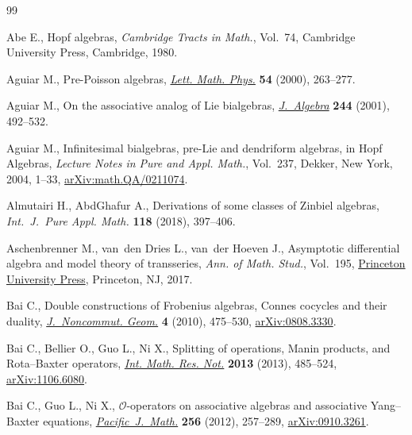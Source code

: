 \documentclass[10pt,a4paper]{amsart}
\numberwithin{equation}{section}
\begin{document}

\begin{thebibliography}{99}
\footnotesize\itemsep=0pt

Abe E., Hopf algebras, \textit{Cambridge Tracts in Math.}, Vol.~74, Cambridge
 University Press, Cambridge, 1980.

Aguiar M., Pre-{P}oisson algebras, \href{https://doi.org/10.1023/A:1010818119040}{\textit{Lett. Math. Phys.}} \textbf{54}
 (2000), 263--277.

Aguiar M., On the associative analog of {L}ie bialgebras, \href{https://doi.org/10.1006/jabr.2001.8877}{\textit{J.~Algebra}}
 \textbf{244} (2001), 492--532.

Aguiar M., Infinitesimal bialgebras, pre-{L}ie and dendriform algebras, in Hopf
 Algebras, \textit{Lecture Notes in Pure and Appl. Math.}, Vol.~237, Dekker,
 New York, 2004, 1--33, \href{https://arxiv.org/abs/math.QA/0211074}{arXiv:math.QA/0211074}.

Almutairi H., AbdGhafur A., Derivations of some classes of {Z}inbiel algebras,
 \textit{Int.~J.~Pure Appl. Math.} \textbf{118} (2018), 397--406.

Aschenbrenner M., van~den Dries L., van~der Hoeven J., Asymptotic differential
 algebra and model theory of transseries, \textit{Ann. of Math. Stud.}, Vol.~195, \href{https://doi.org/10.1515/9781400885411}{Princeton University Press}, Princeton, NJ, 2017.

Bai C., Double constructions of {F}robenius algebras, {C}onnes cocycles and
 their duality, \href{https://doi.org/10.4171/JNCG/64}{\textit{J.~Noncommut. Geom.}} \textbf{4} (2010), 475--530,
 \href{https://arxiv.org/abs/0808.3330}{arXiv:0808.3330}.

Bai C., Bellier O., Guo L., Ni X., Splitting of operations, {M}anin products,
 and {R}ota--{B}axter operators, \href{https://doi.org/10.1093/imrn/rnr266}{\textit{Int. Math. Res. Not.}} \textbf{2013}
 (2013), 485--524, \href{https://arxiv.org/abs/1106.6080}{arXiv:1106.6080}.

Bai C., Guo L., Ni X., {$\mathcal{O}$}-operators on associative algebras and
 associative {Y}ang--{B}axter equations, \href{https://doi.org/10.2140/pjm.2012.256.257}{\textit{Pacific~J.~Math.}}
 \textbf{256} (2012), 257--289, \href{https://arxiv.org/abs/0910.3261}{arXiv:0910.3261}.


\end{thebibliography}
\end{document}
